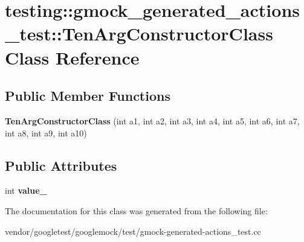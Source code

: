 \hypertarget{classtesting_1_1gmock__generated__actions__test_1_1_ten_arg_constructor_class}{}\section{testing\+:\+:gmock\+\_\+generated\+\_\+actions\+\_\+test\+:\+:Ten\+Arg\+Constructor\+Class Class Reference}
\label{classtesting_1_1gmock__generated__actions__test_1_1_ten_arg_constructor_class}
\subsection*{Public Member Functions}
\begin{DoxyCompactItemize}
\item 
\mbox{\label{classtesting_1_1gmock__generated__actions__test_1_1_ten_arg_constructor_class_ac17a2190151616f986a193dfe0a03cb5}} 
{\bfseries Ten\+Arg\+Constructor\+Class} (int a1, int a2, int a3, int a4, int a5, int a6, int a7, int a8, int a9, int a10)
\end{DoxyCompactItemize}
\subsection*{Public Attributes}
\begin{DoxyCompactItemize}
\item 
\mbox{\label{classtesting_1_1gmock__generated__actions__test_1_1_ten_arg_constructor_class_ae3c388fd7e3cfbb95196712076a368ad}} 
int {\bfseries value\+\_\+}
\end{DoxyCompactItemize}


The documentation for this class was generated from the following file\+:\begin{DoxyCompactItemize}
\item 
vendor/googletest/googlemock/test/gmock-\/generated-\/actions\+\_\+test.\+cc\end{DoxyCompactItemize}
